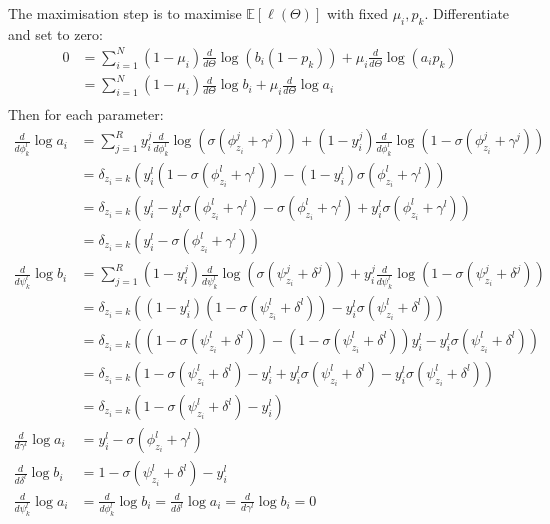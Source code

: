 \documentclass[a4paper]{article}
\begin{document}
    The maximisation step is to maximise $\mathbb E[\ell(\Theta)]$ with fixed $\mu_i, p_k$. Differentiate and set to zero:
    \begin{align}
        0 &= \sum_{i = 1}^N (1 - \mu_i) \frac{d}{d\Theta} \log \left(b_i (1 - p_k)\right) + \mu_i \frac{d}{d\Theta} \log \left(a_i p_k\right)\\
            &= \sum_{i = 1}^N (1 - \mu_i) \frac{d}{d\Theta} \log b_i + \mu_i \frac{d}{d\Theta} \log a_i\\
    \end{align}
    Then for each parameter:
    \begin{align}
        \frac{d}{d\phi_k^l} \log a_i &= \sum_{j = 1}^R y_i^j \frac{d}{d\phi_k^l} \log\left(\sigma(\phi_{z_i}^j + \gamma^j)\right) + \left(1 - y_i^j\right) \frac{d}{d\phi_k^l} \log \left(1 - \sigma(\phi_{z_i}^j + \gamma^j)\right)\\
            &= \delta_{z_i = k} \left(y_i^l \left(1 - \sigma(\phi_{z_i}^l + \gamma^l)\right) - \left(1 - y_i^l\right) \sigma(\phi_{z_i}^l + \gamma^l)\right)\\
            &= \delta_{z_i = k} \left(y_i^l - y_i^l \sigma(\phi_{z_i}^l + \gamma^l) - \sigma(\phi_{z_i}^l + \gamma^l) + y_i^l \sigma(\phi_{z_i}^l + \gamma^l)\right)\\
            &= \delta_{z_i = k} \left(y_i^l - \sigma(\phi_{z_i}^l + \gamma^l)\right)\\
        \frac{d}{d\psi_k^l} \log b_i &= \sum_{j = 1}^R \left(1 - y_i^j\right)\frac{d}{d\psi_k^l} \log\left(\sigma(\psi_{z_i}^j + \delta^j)\right) + y_i^j \frac{d}{d\psi_k^l} \log \left(1 - \sigma(\psi_{z_i}^j + \delta^j)\right)\\
            &= \delta_{z_i = k} \left(\left(1 - y_i^l\right)\left(1 - \sigma(\psi_{z_i}^l + \delta^l)\right) - y_i^l \sigma(\psi_{z_i}^l + \delta^l)\right)\\
            &= \delta_{z_i = k} \left(\left(1 - \sigma(\psi_{z_i}^l + \delta^l)\right) - \left(1 - \sigma(\psi_{z_i}^l + \delta^l)\right) y_i^l - y_i^l \sigma(\psi_{z_i}^l + \delta^l)\right)\\
            &= \delta_{z_i = k} \left(1 - \sigma(\psi_{z_i}^l + \delta^l) - y_i^l + y_i^l \sigma(\psi_{z_i}^l + \delta^l) - y_i^l \sigma(\psi_{z_i}^l + \delta^l)\right)\\
            &= \delta_{z_i = k} \left(1 - \sigma(\psi_{z_i}^l + \delta^l) - y_i^l\right)\\
        \frac{d}{d\gamma^l} \log a_i &= y_i^l - \sigma(\phi_{z_i}^l + \gamma^l)\\
        \frac{d}{d\delta^l} \log b_i &= 1 - \sigma(\psi_{z_i}^l + \delta^l) - y_i^l\\
        \frac{d}{d\psi_k^l} \log a_i &= \frac{d}{d\phi_k^l} \log b_i = \frac{d}{d\delta^l} \log a_i = \frac{d}{d\gamma^l} \log b_i = 0
    \end{align}
\end{document}
